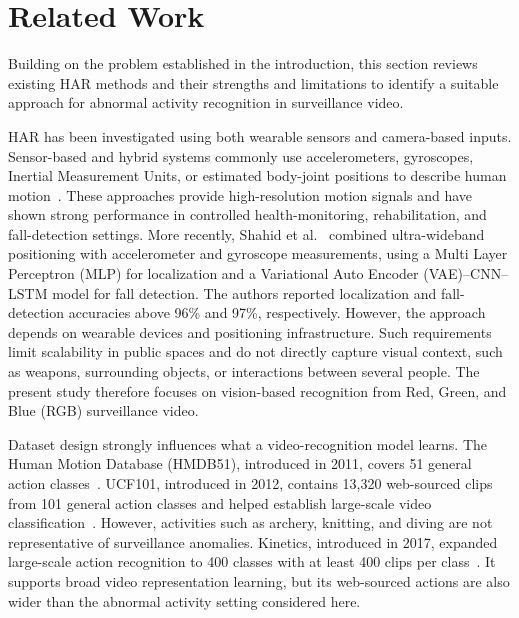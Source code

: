 \documentclass[journal,article,submit,moreauthors]{Definitions/mdpi}
\begin{document}
    \section{Related Work}
    \label{sec:related-work}

    Building on the problem established in the introduction, this section reviews existing
    HAR methods and their strengths and limitations to identify a suitable approach for 
    abnormal activity recognition in surveillance video.

    HAR has been investigated using both wearable sensors and camera-based inputs. 
    Sensor-based and hybrid systems commonly use accelerometers, gyroscopes, Inertial
    Measurement Units, or estimated body-joint positions to describe human 
    motion~\cite{talukder2024cnn_convlstm_lrcn,frontiers_wearable_cnn2024}. These 
    approaches provide high-resolution motion signals and have shown strong performance 
    in controlled health-monitoring, rehabilitation, and fall-detection settings. More
    recently, Shahid et al.~\cite{moazam2026} combined ultra-wideband positioning with 
    accelerometer and gyroscope measurements, using a Multi Layer Perceptron (MLP)
    for localization and a Variational Auto Encoder (VAE)--CNN--LSTM model for fall
    detection. The authors reported localization and
    fall-detection accuracies above 96\% and 97\%, respectively. However, the approach
    depends on wearable devices and positioning infrastructure. Such requirements limit 
    scalability in public spaces and do not directly capture visual context, such as
    weapons, surrounding objects, or interactions between several people. The present 
    study therefore focuses on vision-based recognition from Red, Green, and Blue
    (RGB) surveillance video.

    Dataset design strongly influences what a video-recognition model learns. The Human
    Motion Database (HMDB51), introduced in 2011, covers 51 general action
    classes~\cite{kuehne2011hmdb}. UCF101, introduced in 2012, contains 13,320
    web-sourced clips from 101 general action
    classes and helped establish large-scale video 
    classification~\cite{soomro2012ucf101}. However, activities such as archery, 
    knitting, and diving are not representative of surveillance anomalies. Kinetics, 
    introduced in 2017, expanded large-scale action recognition to 400 classes with at
    least 400 clips per class~\cite{kay2017kinetics}. It supports broad video 
    representation learning, but its web-sourced actions are also wider than the 
    abnormal activity setting considered here.
\end{document}
